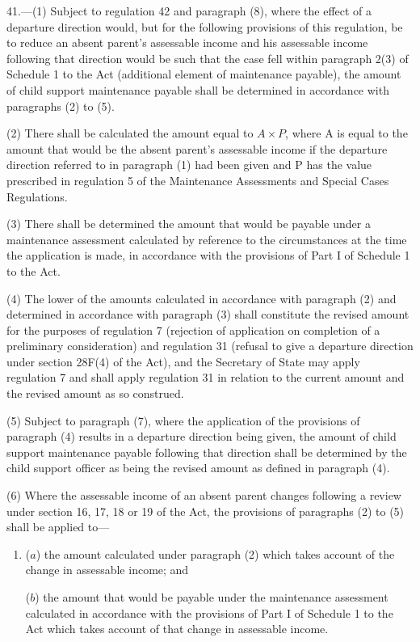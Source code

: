 \documentclass[a4paper]{article}
\begin{document}
41.—(1) Subject to regulation 42
and paragraph (8), where the effect of a departure direction would, but for the
following provisions of this regulation, be to reduce an absent parent’s
assessable income and his assessable income following that direction would be
such that the case fell within paragraph 2(3) of Schedule 1 to the Act
(additional element of maintenance payable), the amount of child support
maintenance payable shall be determined in accordance with paragraphs (2) to
(5).

(2) There shall be calculated the amount equal to \(A \times P\), where A is equal to the
amount that would be the absent parent’s assessable income if the departure
direction referred to in paragraph (1) had been given and P has the value
prescribed in regulation 5 of the Maintenance Assessments and Special Cases
Regulations.

(3) There shall be determined the amount that would be payable under a
maintenance assessment calculated by reference to the circumstances at the time
the application is made, in accordance with the provisions of Part I of Schedule
1 to the Act.

(4) The lower of the amounts calculated in accordance with paragraph (2) and
determined in accordance with paragraph (3) shall constitute the revised amount
for the purposes of regulation 7 (rejection of application on completion of a
preliminary consideration) and regulation 31 (refusal to give a departure
direction under section 28F(4) of the Act), and the Secretary of State may apply
regulation 7 and shall apply regulation 31 in relation to the current amount and
the revised amount as so construed.

(5) Subject to paragraph (7), where the application of the provisions of
paragraph (4) results in a departure direction being given, the amount of child
support maintenance payable following that direction shall be determined by the
child support officer as being the revised amount as defined in paragraph (4).

(6) Where the assessable income of an absent parent changes following a review
under section 16, 17, 18 or 19 of the Act, the provisions of paragraphs (2) to
(5) shall be applied to—
\begin{enumerate}\item[]
($a$) the amount calculated under paragraph (2) which takes account of the change
in assessable income; and

($b$) the amount that would be payable under the maintenance assessment calculated
in accordance with the provisions of Part I of Schedule 1 to the Act which takes
account of that change in assessable income.
\end{enumerate}
\end{document}
